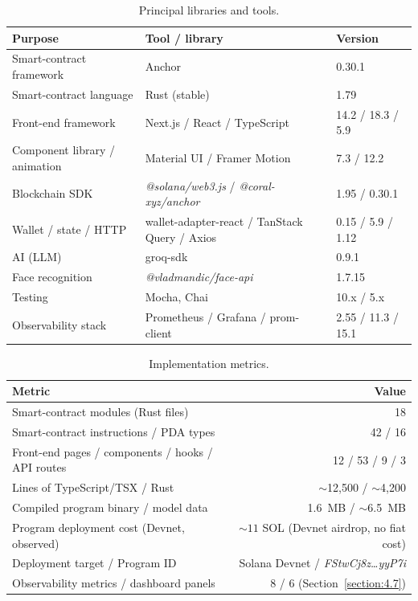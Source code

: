 \begin{table}[H]
\centering
\caption{Principal libraries and tools.}
\label{table:tools}
\small
\begin{tabular}{|l|l|l|}
\hline
\textbf{Purpose} & \textbf{Tool / library} & \textbf{Version} \\ \hline
Smart-contract framework & Anchor & 0.30.1 \\ \hline
Smart-contract language & Rust (stable) & 1.79 \\ \hline
Front-end framework & Next.js / React / TypeScript & 14.2 / 18.3 / 5.9 \\ \hline
Component library / animation & Material UI / Framer Motion & 7.3 / 12.2 \\ \hline
Blockchain SDK & \emph{@solana/web3.js} / \emph{@coral-xyz/anchor} & 1.95 / 0.30.1 \\ \hline
Wallet / state / HTTP & wallet-adapter-react / TanStack Query / Axios & 0.15 / 5.9 / 1.12 \\ \hline
AI (LLM) & groq-sdk & 0.9.1 \\ \hline
Face recognition & \emph{@vladmandic/face-api} & 1.7.15 \\ \hline
Testing & Mocha, Chai & 10.x / 5.x \\ \hline
Observability stack & Prometheus / Grafana / prom-client & 2.55 / 11.3 / 15.1 \\ \hline
\end{tabular}
\end{table}

\begin{table}[H]
\centering
\caption{Implementation metrics.}
\label{table:achievement}
\small
\begin{tabular}{|l|r|}
\hline
\textbf{Metric} & \textbf{Value} \\ \hline
Smart-contract modules (Rust files) & 18 \\ \hline
Smart-contract instructions / PDA types & 42 / 16 \\ \hline
Front-end pages / components / hooks / API routes & 12 / 53 / 9 / 3 \\ \hline
Lines of TypeScript/TSX / Rust & $\sim$12{,}500 / $\sim$4{,}200 \\ \hline
Compiled program binary / model data & 1.6~MB / $\sim$6.5~MB \\ \hline
Program deployment cost (Devnet, observed) & ${\sim}11$ SOL (Devnet airdrop, no fiat cost) \\ \hline
Deployment target / Program ID & Solana Devnet / \emph{FStwCj8z\ldots yyP7i} \\ \hline
Observability metrics / dashboard panels & 8 / 6 (Section~\ref{section:4.7}) \\ \hline
\end{tabular}
\end{table}

